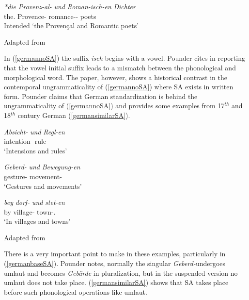 \begin{exe}
    \ex \label{germannoSA}
    \gll 
    \textit{*die} \textit{Provenz-al-} \textit{und} \textit{Roman-isch-en} \textit{Dichter} \\ the.{\Pl} Provence-{\Der} {\And} romance-{\Der}-{\Pl} poets \\
    \glt Intended `the Provençal and Romantic poets'
    
    \hfill Adapted from \cite{pounder2006broken}
\end{exe}

In (\ref{germannoSA}) the suffix \textit{isch} begins with a vowel. Pounder cites \cite{booij1985coordination} in reporting that the vowel initial suffix leads to a mismatch between the phonological and morphological word. The paper, however, shows a historical contrast in the contemporal ungrammaticality of (\ref{germannoSA}) where SA exists in written form. Pounder claims that German standardization is behind the ungrammaticality of (\ref{germannoSA}) and provides some examples from 17$^{th}$ and 18$^{th}$ century German (\ref{germansimilarSA}).

\begin{exe}
    \ex \label{germansimilarSA}
    \begin{xlist}
        \ex 
        \gll
        \textit{Absicht-} \textit{und} \textit{Regl-en} \\ intention- {\And} rule-{\Pl} \\
        \glt `Intensions and rules'
        
        \ex \label{germanbaseSA}
        \gll 
        \textit{Geberd-} \textit{und} \textit{Bewegung-en} \\ gesture- {\And} movement-{\Pl} \\
        \glt `Gestures and movements'
        
        \ex 
        \gll
        \textit{bey} \textit{dorf-} \textit{und} \textit{stet-en} \\ by village- {\And} town-{\Pl}.{\Dat} \\
        \glt `In villages and towns'
    \end{xlist}
    \hfill Adapted from \cite{pounder2006broken}
\end{exe}

There is a very important point to make in these examples, particularly in (\ref{germanbaseSA}). Pounder notes, normally the singular \textit{Geberd-}undergoes umlaut and becomes \textit{Geb\"{a}rde} in pluralization, but in the suspended version no umlaut does not take place. (\ref{germansimilarSA}) shows that SA takes place before such phonological operations like umlaut.

